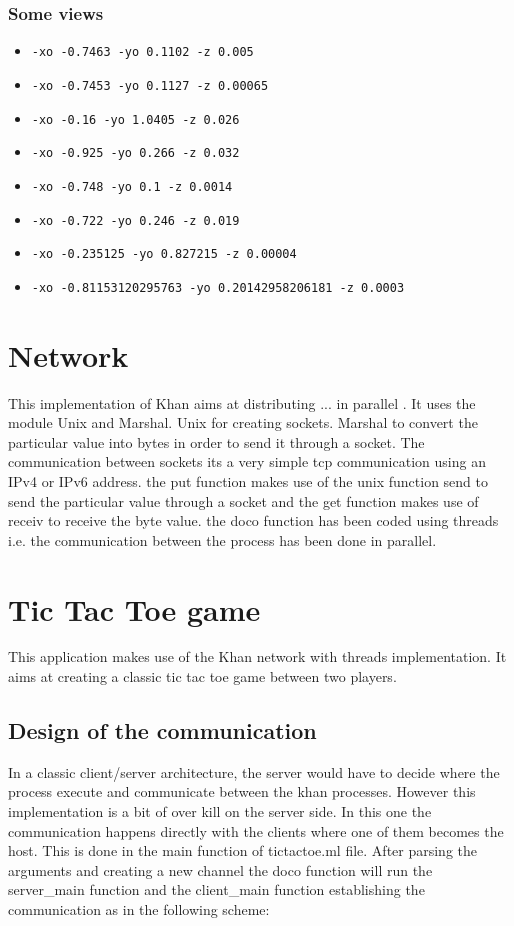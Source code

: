 \documentclass{article}
\begin{document}
\subsubsection{Some views}
\begin{itemize}[label={}]
	\item \texttt{-xo -0.7463 -yo 0.1102 -z 0.005}
	\item \texttt{-xo -0.7453 -yo 0.1127 -z 0.00065}
	\item \texttt{-xo -0.16 -yo 1.0405 -z 0.026}
	\item \texttt{-xo -0.925 -yo 0.266 -z 0.032}
	\item \texttt{-xo -0.748 -yo 0.1 -z 0.0014}
	\item \texttt{-xo -0.722 -yo 0.246 -z 0.019}
	\item \texttt{-xo -0.235125 -yo 0.827215 -z 0.00004}
	\item \texttt{-xo -0.81153120295763 -yo 0.20142958206181 -z 0.0003}
\end{itemize}\section{Network}
This implementation of Khan aims at distributing  ... in parallel . It uses the module Unix and Marshal. Unix for creating sockets. Marshal to convert the particular value into bytes in order to send it through a socket. The communication between sockets its a very simple tcp communication using an IPv4 or IPv6 address. the put function makes use of the unix function send to send the particular value through a socket and the get function makes use of receiv to receive the byte value.
the doco function has been coded using threads i.e. the communication between the process has been done in parallel. 

\section{Tic Tac Toe game}

This application makes use of the Khan network with threads implementation. It aims at creating a classic tic tac toe game between two players. 

\subsection{Design of the communication }

In a classic client/server architecture, the server would have to decide where the process execute and communicate between the khan processes.  However this implementation is a bit of over kill on the server side. In this one the communication happens directly with the clients where one of them becomes the host. This is done in the main function of tictactoe.ml file. After parsing the arguments and creating a new channel the doco function will run the server\_main function and the client\_main function establishing the communication as in the following scheme:
\end{document}
